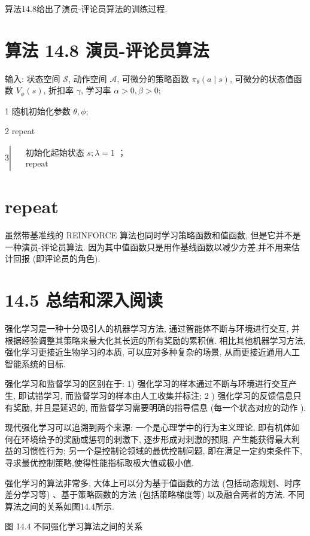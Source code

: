 \documentclass[10pt]{article}
\begin{document}
算法14.8给出了演员-评论员算法的训练过程.

\section*{算法 14.8 演员-评论员算法}
输入: 状态空间 $\mathcal{S}$, 动作空间 $\mathcal{A}$, 可微分的策略函数 $\pi_{\theta}(a \mid s)$, 可微分的状态值函数 $V_{\phi}(s)$, 折扣率 $\gamma$, 学习率 $\alpha>0, \beta>0$;

1 随机初始化参数 $\theta, \phi$;

2 repeat

$3 \left\lvert\, \begin{aligned} & \text { 初始化起始状态 } s ; \lambda=1 \text { ； } \\ & \text { repeat }\end{aligned}\right.$

\section*{repeat}
虽然带基准线的 REINFORCE 算法也同时学习策略函数和值函数, 但是它并不是一种演员-评论员算法. 因为其中值函数只是用作基线函数以减少方差,并不用来估计回报 (即评论员的角色).

\section*{14.5 总结和深入阅读}
强化学习是一种十分吸引人的机器学习方法, 通过智能体不断与环境进行交互, 并根据经验调整其策略来最大化其长远的所有奖励的累积值. 相比其他机器学习方法, 强化学习更接近生物学习的本质, 可以应对多种复杂的场景, 从而更接近通用人工智能系统的目标.

强化学习和监督学习的区别在于: 1) 强化学习的样本通过不断与环境进行交互产生, 即试错学习, 而监督学习的样本由人工收集并标注; 2 ) 强化学习的反馈信息只有奖励, 并且是延迟的, 而监督学习需要明确的指导信息 (每一个状态对应的动作 ).

现代强化学习可以追溯到两个来源: 一个是心理学中的行为主义理论, 即有机体如何在环境给予的奖励或惩罚的刺激下, 逐步形成对刺激的预期, 产生能获得最大利益的习惯性行为; 另一个是控制论领域的最优控制问题, 即在满足一定约束条件下,寻求最优控制策略,使得性能指标取极大值或极小值.

强化学习的算法非常多, 大体上可以分为基于值函数的方法 (包括动态规划、时序差分学习等) 、基于策略函数的方法 (包括策略梯度等) 以及融合两者的方法. 不同算法之间的关系如图14.4所示.



图 14.4 不同强化学习算法之间的关系
\end{document}
